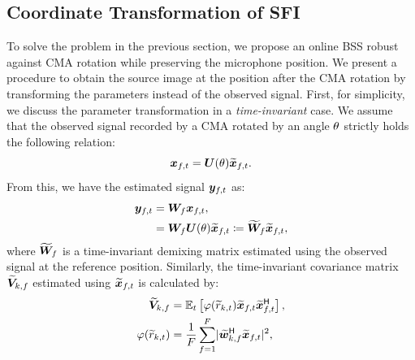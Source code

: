 \documentclass[sip,biber]{now-journal}
\begin{document}
\subsection{Coordinate Transformation of SFI}

To solve the problem in the previous section, we propose an online BSS robust against CMA rotation while preserving the microphone position.
We present a procedure to obtain the source image at the position after the CMA rotation by transforming the parameters instead of the observed signal.
First, for simplicity, we discuss the parameter transformation in a \emph{time-invariant} case.
We assume that the observed signal recorded by a CMA rotated by an angle $\theta$ strictly holds the following relation:
\begin{equation}
  \Obs _{\ft} = \rotMat (\rotSpat) \refpos{\Obs} _{\ft}.
\end{equation}
From this, we have the estimated signal $\Est _{\ft}$ as:
\begin{align}
  \Est _{\ft} &= \Demix _{\freq} \Obs _{\ft}, \\
              &= \Demix _{\freq} \rotMat (\rotSpat) \refpos{\Obs} _{\ft} \coloneqq \refpos{\Demix} _{\freq} \refpos{\Obs} _{\ft}, \label{eq:rt:demix:batch}
\end{align}
where $\widetilde{\bm{W}} _{f}$ is a time-invariant demixing matrix estimated using the observed signal at the reference position.
Similarly, the time-invariant covariance matrix $\widetilde{\bm{V}} _{k,f}$ estimated using $\refpos{\Obs} _{\ft}$ is calculated by:
\begin{align}
  \refpos{\cov} _{\src,\freq} &= \expct  _{\tframe} \left[\weight (\refpos{\var} _{\src,\tframe}) \refpos{\Obs} _{\ft} \refpos{\Obs} _{\ft} ^{\hermite}\right], \\
  \weight (\refpos{\var} _{\src,\tframe}) &= \frac{1}{\Freq} \sum _{\freq = 1} ^{\Freq} \lvert \refpos{\demix} _{\src,\freq} ^{\hermite} \refpos{\Obs} _{\ft} \rvert ^2,
\end{align}
\end{document}
